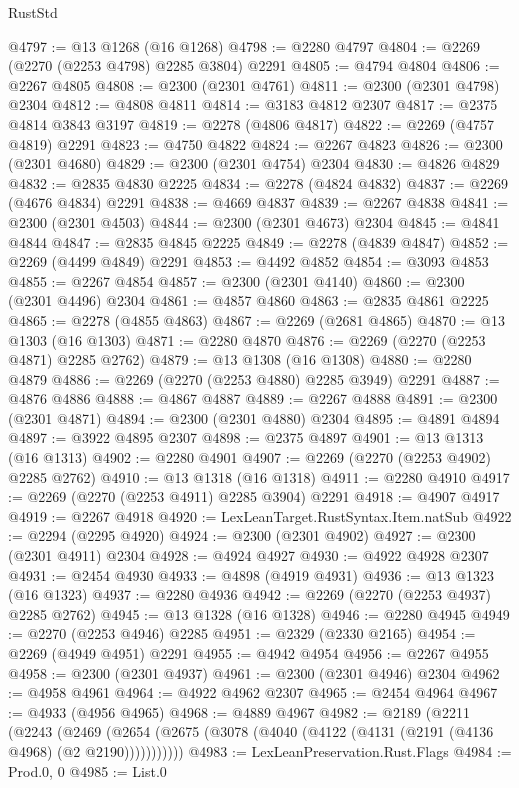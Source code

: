 \begin{lexlean}{RustStd}
\begin{coremodule}
{\begin{coremodule}
{{{{{{{{{{{{@4797 := @13 @1268 (@16 @1268)
@4798 := @2280 @4797
@4804 := @2269 (@2270 (@2253 @4798) @2285 @3804) @2291
@4805 := @4794 @4804
@4806 := @2267 @4805
@4808 := @2300 (@2301 @4761)
@4811 := @2300 (@2301 @4798) @2304
@4812 := @4808 @4811
@4814 := @3183 @4812 @2307
@4817 := @2375 @4814 @3843 @3197
@4819 := @2278 (@4806 @4817)
@4822 := @2269 (@4757 @4819) @2291
@4823 := @4750 @4822
@4824 := @2267 @4823
@4826 := @2300 (@2301 @4680)
@4829 := @2300 (@2301 @4754) @2304
@4830 := @4826 @4829
@4832 := @2835 @4830 @2225
@4834 := @2278 (@4824 @4832)
@4837 := @2269 (@4676 @4834) @2291
@4838 := @4669 @4837
@4839 := @2267 @4838
@4841 := @2300 (@2301 @4503)
@4844 := @2300 (@2301 @4673) @2304
@4845 := @4841 @4844
@4847 := @2835 @4845 @2225
@4849 := @2278 (@4839 @4847)
@4852 := @2269 (@4499 @4849) @2291
@4853 := @4492 @4852
@4854 := @3093 @4853
@4855 := @2267 @4854
@4857 := @2300 (@2301 @4140)
@4860 := @2300 (@2301 @4496) @2304
@4861 := @4857 @4860
@4863 := @2835 @4861 @2225
@4865 := @2278 (@4855 @4863)
@4867 := @2269 (@2681 @4865)
@4870 := @13 @1303 (@16 @1303)
@4871 := @2280 @4870
@4876 := @2269 (@2270 (@2253 @4871) @2285 @2762)
@4879 := @13 @1308 (@16 @1308)
@4880 := @2280 @4879
@4886 := @2269 (@2270 (@2253 @4880) @2285 @3949) @2291
@4887 := @4876 @4886
@4888 := @4867 @4887
@4889 := @2267 @4888
@4891 := @2300 (@2301 @4871)
@4894 := @2300 (@2301 @4880) @2304
@4895 := @4891 @4894
@4897 := @3922 @4895 @2307
@4898 := @2375 @4897
@4901 := @13 @1313 (@16 @1313)
@4902 := @2280 @4901
@4907 := @2269 (@2270 (@2253 @4902) @2285 @2762)
@4910 := @13 @1318 (@16 @1318)
@4911 := @2280 @4910
@4917 := @2269 (@2270 (@2253 @4911) @2285 @3904) @2291
@4918 := @4907 @4917
@4919 := @2267 @4918
@4920 := LexLeanTarget.RustSyntax.Item.natSub
@4922 := @2294 (@2295 @4920)
@4924 := @2300 (@2301 @4902)
@4927 := @2300 (@2301 @4911) @2304
@4928 := @4924 @4927
@4930 := @4922 @4928 @2307
@4931 := @2454 @4930
@4933 := @4898 (@4919 @4931)
@4936 := @13 @1323 (@16 @1323)
@4937 := @2280 @4936
@4942 := @2269 (@2270 (@2253 @4937) @2285 @2762)
@4945 := @13 @1328 (@16 @1328)
@4946 := @2280 @4945
@4949 := @2270 (@2253 @4946) @2285
@4951 := @2329 (@2330 @2165)
@4954 := @2269 (@4949 @4951) @2291
@4955 := @4942 @4954
@4956 := @2267 @4955
@4958 := @2300 (@2301 @4937)
@4961 := @2300 (@2301 @4946) @2304
@4962 := @4958 @4961
@4964 := @4922 @4962 @2307
@4965 := @2454 @4964
@4967 := @4933 (@4956 @4965)
@4968 := @4889 @4967
@4982 := @2189
    (@2211
      (@2243
        (@2469 (@2654 (@2675 (@3078 (@4040 (@4122 (@4131 (@2191 (@4136 @4968) (@2 @2190)))))))))))
@4983 := LexLeanPreservation.Rust.Flags
@4984 := Prod.{0, 0}
@4985 := List.{0}
}}}}}}}}}}}}
\end{coremodule}}
\end{coremodule}
\end{lexlean}
